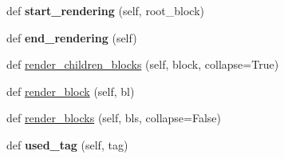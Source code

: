 \begin{DoxyCompactItemize}
def {\bfseries start\+\_\+rendering} (self, root\+\_\+block)
\item 
\hypertarget{classtexla_1_1Renderers_1_1Renderer_1_1Renderer_a0c01fa2fc88f08a8ad3b4eb10a6cbf56}{}\label{classtexla_1_1Renderers_1_1Renderer_1_1Renderer_a0c01fa2fc88f08a8ad3b4eb10a6cbf56} 
def {\bfseries end\+\_\+rendering} (self)
\item 
def \hyperlink{classtexla_1_1Renderers_1_1Renderer_1_1Renderer_a3fda0b658f6e8b0215e2d9062d0f0893}{render\+\_\+children\+\_\+blocks} (self, block, collapse=True)
\item 
def \hyperlink{classtexla_1_1Renderers_1_1Renderer_1_1Renderer_ae58221b6a1aec6777d7e6d1bbc97e254}{render\+\_\+block} (self, bl)
\item 
def \hyperlink{classtexla_1_1Renderers_1_1Renderer_1_1Renderer_af8fccb30690606612e6c62851cd899fe}{render\+\_\+blocks} (self, bls, collapse=False)
\item 
\hypertarget{classtexla_1_1Renderers_1_1Renderer_1_1Renderer_a34cd4a95caeb1ffcc144fb71321ef671}{}\label{classtexla_1_1Renderers_1_1Renderer_1_1Renderer_a34cd4a95caeb1ffcc144fb71321ef671} 
def {\bfseries used\+\_\+tag} (self, tag)
\end{DoxyCompactItemize}
